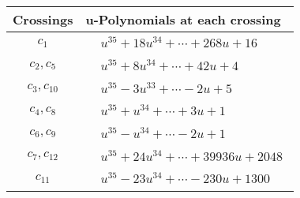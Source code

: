 \documentclass[1p]{elsarticle_modified}
\theoremstyle{definition}
\begin{document}
\begin{tabular}{m{50pt}|m{274pt}}
Crossings & \hspace{64pt}u-Polynomials at each crossing \\
\hline $$\begin{aligned}c_{1}\end{aligned}$$&$\begin{aligned}
&u^{35}+18 u^{34}+\cdots+268 u+16
\end{aligned}$\\
\hline $$\begin{aligned}c_{2},c_{5}\end{aligned}$$&$\begin{aligned}
&u^{35}+8 u^{34}+\cdots+42 u+4
\end{aligned}$\\
\hline $$\begin{aligned}c_{3},c_{10}\end{aligned}$$&$\begin{aligned}
&u^{35}-3 u^{33}+\cdots-2 u+5
\end{aligned}$\\
\hline $$\begin{aligned}c_{4},c_{8}\end{aligned}$$&$\begin{aligned}
&u^{35}+u^{34}+\cdots+3 u+1
\end{aligned}$\\
\hline $$\begin{aligned}c_{6},c_{9}\end{aligned}$$&$\begin{aligned}
&u^{35}- u^{34}+\cdots-2 u+1
\end{aligned}$\\
\hline $$\begin{aligned}c_{7},c_{12}\end{aligned}$$&$\begin{aligned}
&u^{35}+24 u^{34}+\cdots+39936 u+2048
\end{aligned}$\\
\hline $$\begin{aligned}c_{11}\end{aligned}$$&$\begin{aligned}
&u^{35}-23 u^{34}+\cdots-230 u+1300
\end{aligned}$\\
\hline
\end{tabular}\\~\\
\newpage\renewcommand{\arraystretch}{1}
\end{document}

